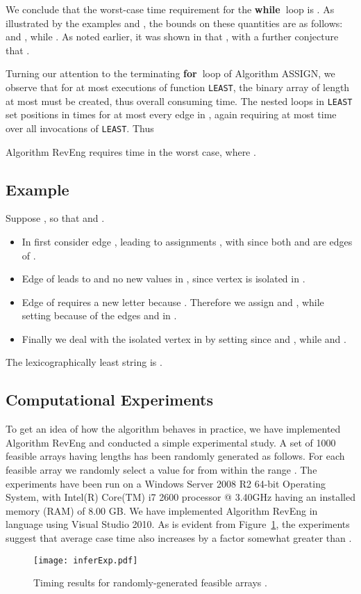 \documentclass[runningheads,a4paper]{llncs}
\def\s#1{\mbox{\boldmath }}
\def\bfor{{\bf for\ }}
\def\bwhile{{\bf while\ }}
\begin{document}
We conclude that the worst-case time requirement for the \bwhile loop
is .
As illustrated by the examples
 and ,
the bounds on these quantities are as follows:
 and ,
while .
As noted earlier, it was shown in \cite{BBD14} that
, with a further conjecture that
.

Turning our attention to the terminating \bfor loop of Algorithm ASSIGN,
we observe that for at most  executions of function {\tt LEAST}, the binary array 
of length at most  must be created,
thus overall consuming  time.
The nested  loops in {\tt LEAST} set positions in   times
for at most every edge in , again requiring at most
 time over all invocations of {\tt LEAST}.
Thus
\begin{lemma}
Algorithm RevEng requires  time in the worst case,
where .
\end{lemma}

\subsection{Example}
Suppose , so that
 and .
\begin{itemize}
\item
In  first consider edge ,
leading to assignments ,
with  since both  and  are edges of .
\item
Edge  of  leads to  and no new values in ,
since vertex  is isolated in .
\item
Edge  of  requires a new letter because .
Therefore we assign  and ,
while setting  because of the edges
 and  in .
\item
Finally we deal with the isolated vertex  in 
by setting  since  and ,
while  and .
\end{itemize}
The lexicographically least string
is .


\subsection{Computational Experiments}
To get an idea of how the algorithm behaves in practice, we have implemented
Algorithm RevEng and conducted a simple experimental study. A set of 1000
feasible arrays having lengths  has been randomly generated as
follows. For each feasible array  we randomly select a value for
 from within the range . The experiments
have been run on a Windows Server 2008 R2 64-bit Operating System, with
Intel(R) Core(TM) i7 2600 processor @ 3.40GHz having an installed memory (RAM)
of 8.00 GB. We have implemented Algorithm RevEng in  language using Visual
Studio 2010. As is evident from Figure~\ref{fig-tests}, the experiments suggest
that average case time also increases by a factor somewhat greater than .
\begin{figure}[t!]
  \centering
  \texttt{[image: inferExp.pdf]}
  \caption{Timing results for randomly-generated feasible arrays
  \s{y}.}
  \label{fig-tests}
\end{figure}
\end{document}
